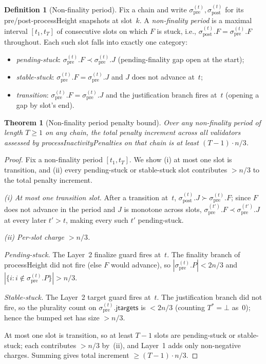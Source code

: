 \documentclass{article}
\newcommand{\jtargets}{\mathsf{jtargets}}
\newcommand{\processHeight}{\textsf{processHeight}\xspace}
\newcommand{\processInactivityPenalties}{\textsf{processInactivityPenalties}\xspace}
\theoremstyle{plain}
\newtheorem{theorem}{Theorem}
\theoremstyle{definition}
\newtheorem{definition}{Definition}
\theoremstyle{remark}
\begin{document}
\begin{definition}[Non-finality period]\label{def:non-finality-period}
Fix a chain and write $\sigma_{\mathrm{pre}}^{(t)}, \sigma_{\mathrm{post}}^{(t)}$ for its pre/post-\processHeight snapshots at slot~$k$.
A \emph{non-finality period} is a maximal interval $[t_1, t_T]$ of consecutive slots on which $F$ is stuck, i.e., $\sigma_{\mathrm{post}}^{(t)}.F = \sigma_{\mathrm{pre}}^{(t)}.F$ throughout.
Each such slot falls into exactly one category:
\begin{itemize}
  \item \emph{pending-stuck}: $\sigma_{\mathrm{pre}}^{(t)}.F \prec \sigma_{\mathrm{pre}}^{(t)}.J$ (pending-finality gap open at the start);
  \item \emph{stable-stuck}: $\sigma_{\mathrm{pre}}^{(t)}.F = \sigma_{\mathrm{pre}}^{(t)}.J$ and $J$ does not advance at~$t$;
  \item \emph{transition}: $\sigma_{\mathrm{pre}}^{(t)}.F = \sigma_{\mathrm{pre}}^{(t)}.J$ and the justification branch fires at~$t$ (opening a gap by slot's end).
\end{itemize}
\end{definition}

\begin{theorem}[Non-finality period penalty bound]\label{thm:tightness}
Over any non-finality period of length $T \geq 1$ on any chain, the total penalty increment across all validators assessed by \processInactivityPenalties on that chain is at least $(T - 1) \cdot n/3$.
\end{theorem}

\begin{proof}
Fix a non-finality period $[t_1, t_T]$.
We show (i) at most one slot is transition, and (ii) every pending-stuck or stable-stuck slot contributes $> n/3$ to the total penalty increment.

\emph{(i) At most one transition slot.}
After a transition at~$t$, $\sigma_{\mathrm{post}}^{(t)}.J \succ \sigma_{\mathrm{pre}}^{(t)}.F$; since $F$ does not advance in the period and $J$ is monotone across slots, $\sigma_{\mathrm{pre}}^{(t')}.F \prec \sigma_{\mathrm{pre}}^{(t')}.J$ at every later $t' > t$, making every such $t'$ pending-stuck.

\emph{(ii) Per-slot charge $> n/3$.}

\emph{Pending-stuck.} The Layer~2 finalize guard fires at~$t$.
The finality branch of \processHeight did not fire (else $F$ would advance), so $|\sigma_{\mathrm{pre}}^{(t)}.P| < 2n/3$ and $|\{i : i \notin \sigma_{\mathrm{pre}}^{(t)}.P\}| > n/3$.

\emph{Stable-stuck.} The Layer~2 target guard fires at~$t$.
The justification branch did not fire, so the plurality count on $\sigma_{\mathrm{pre}}^{(t)}.\jtargets$ is $< 2n/3$ (counting $T^* = \bot$ as~$0$); hence the bumped set has size $> n/3$.

At most one slot is transition, so at least $T - 1$ slots are pending-stuck or stable-stuck; each contributes $> n/3$ by~(ii), and Layer~1 adds only non-negative charges.
Summing gives total increment $\geq (T-1) \cdot n/3$.
\end{proof}
\end{document}
